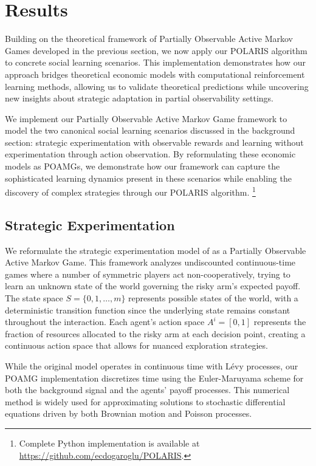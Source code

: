 \documentclass[a4paper,12pt]{report}
\begin{document}
\chapter{Results}

Building on the theoretical framework of Partially Observable Active Markov Games developed in the previous section, we now apply our POLARIS algorithm to concrete social learning scenarios. This implementation demonstrates how our approach bridges theoretical economic models with computational reinforcement learning methods, allowing us to validate theoretical predictions while uncovering new insights about strategic adaptation in partial observability settings.

We implement our Partially Observable Active Markov Game framework to model the two canonical social learning scenarios discussed in the background section: strategic experimentation with observable rewards and learning without experimentation through action observation. By reformulating these economic models as POAMGs, we demonstrate how our framework can capture the sophisticated learning dynamics present in these scenarios while enabling the discovery of complex strategies through our POLARIS algorithm. \footnote{Complete Python implementation is available at \url{https://github.com/ecdogaroglu/POLARIS}.}

\section{Strategic Experimentation}

We reformulate the strategic experimentation model of \citet{keller2020undiscounted} as a Partially Observable Active Markov Game. This framework analyzes undiscounted continuous-time games where a number of symmetric players act non-cooperatively, trying to learn an unknown state of the world governing the risky arm's expected payoff. The state space $S = \{0,1,\ldots,m\}$ represents possible states of the world, with a deterministic transition function since the underlying state remains constant throughout the interaction. Each agent's action space $A^i = [0,1]$ represents the fraction of resources allocated to the risky arm at each decision point, creating a continuous action space that allows for nuanced exploration strategies.

While the original model operates in continuous time with Lévy processes, our POAMG implementation discretizes time using the Euler-Maruyama scheme \citep{kloeden1992numerical, platen1999introduction} for both the background signal and the agents' payoff processes. This numerical method is widely used for approximating solutions to stochastic differential equations driven by both Brownian motion and Poisson processes.
\end{document}
